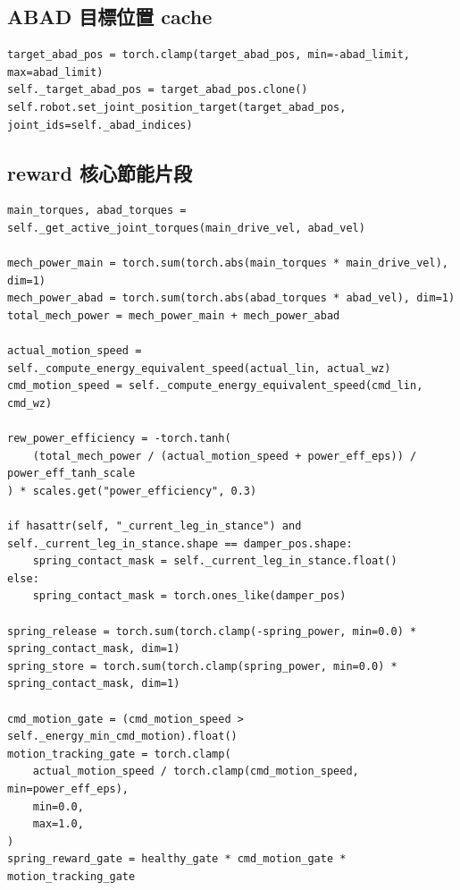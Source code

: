 \documentclass[12pt,a4paper,UTF8]{ctexart}
\begin{document}
\subsection{ABAD 目標位置 cache}

\begin{lstlisting}[style=pythonstyle,caption={ABAD target cache}]
target_abad_pos = torch.clamp(target_abad_pos, min=-abad_limit, max=abad_limit)
self._target_abad_pos = target_abad_pos.clone()
self.robot.set_joint_position_target(target_abad_pos, joint_ids=self._abad_indices)
\end{lstlisting}

\subsection{reward 核心節能片段}

\begin{lstlisting}[style=pythonstyle,caption={節能 reward 核心計算}]
main_torques, abad_torques = self._get_active_joint_torques(main_drive_vel, abad_vel)

mech_power_main = torch.sum(torch.abs(main_torques * main_drive_vel), dim=1)
mech_power_abad = torch.sum(torch.abs(abad_torques * abad_vel), dim=1)
total_mech_power = mech_power_main + mech_power_abad

actual_motion_speed = self._compute_energy_equivalent_speed(actual_lin, actual_wz)
cmd_motion_speed = self._compute_energy_equivalent_speed(cmd_lin, cmd_wz)

rew_power_efficiency = -torch.tanh(
    (total_mech_power / (actual_motion_speed + power_eff_eps)) / power_eff_tanh_scale
) * scales.get("power_efficiency", 0.3)

if hasattr(self, "_current_leg_in_stance") and self._current_leg_in_stance.shape == damper_pos.shape:
    spring_contact_mask = self._current_leg_in_stance.float()
else:
    spring_contact_mask = torch.ones_like(damper_pos)

spring_release = torch.sum(torch.clamp(-spring_power, min=0.0) * spring_contact_mask, dim=1)
spring_store = torch.sum(torch.clamp(spring_power, min=0.0) * spring_contact_mask, dim=1)

cmd_motion_gate = (cmd_motion_speed > self._energy_min_cmd_motion).float()
motion_tracking_gate = torch.clamp(
    actual_motion_speed / torch.clamp(cmd_motion_speed, min=power_eff_eps),
    min=0.0,
    max=1.0,
)
spring_reward_gate = healthy_gate * cmd_motion_gate * motion_tracking_gate
\end{lstlisting}
\end{document}
